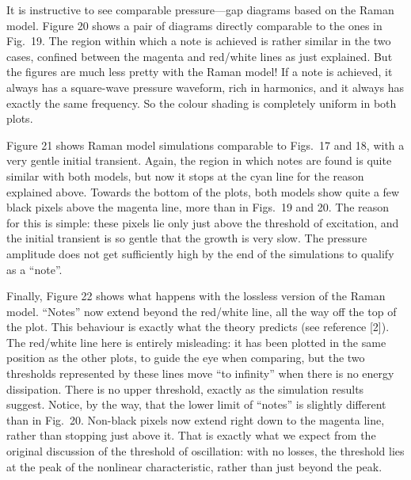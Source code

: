   It is instructive to see comparable pressure—gap diagrams based on the Raman 
  model. Figure 20 shows a pair of diagrams directly comparable to the ones in 
  Fig.\ 19. The region within which a note is achieved is rather similar in the 
  two cases, confined between the magenta and red/white lines as just 
  explained. But the figures are much less pretty with the Raman model! If a 
  note is achieved, it always has a square-wave pressure waveform, rich in 
  harmonics, and it always has exactly the same frequency. So the colour 
  shading is completely uniform in both plots. 



  Figure 21 shows Raman model simulations comparable to Figs.\ 17 and 18, with 
  a very gentle initial transient. Again, the region in which notes are found 
  is quite similar with both models, but now it stops at the cyan line for the 
  reason explained above. Towards the bottom of the plots, both models show 
  quite a few black pixels above the magenta line, more than in Figs.\ 19 and 
  20. The reason for this is simple: these pixels lie only just above the 
  threshold of excitation, and the initial transient is so gentle that the 
  growth is very slow. The pressure amplitude does not get sufficiently high by 
  the end of the simulations to qualify as a “note”. 



  Finally, Figure 22 shows what happens with the lossless version of the Raman 
  model. “Notes” now extend beyond the red/white line, all the way off the top 
  of the plot. This behaviour is exactly what the theory predicts (see 
  reference [2]). The red/white line here is entirely misleading: it has been 
  plotted in the same position as the other plots, to guide the eye when 
  comparing, but the two thresholds represented by these lines move “to 
  infinity” when there is no energy dissipation. There is no upper threshold, 
  exactly as the simulation results suggest. Notice, by the way, that the lower 
  limit of “notes” is slightly different than in Fig.\ 20. Non-black pixels now 
  extend right down to the magenta line, rather than stopping just above it. 
  That is exactly what we expect from the original discussion of the threshold 
  of oscillation: with no losses, the threshold lies at the peak of the 
  nonlinear characteristic, rather than just beyond the peak. 

